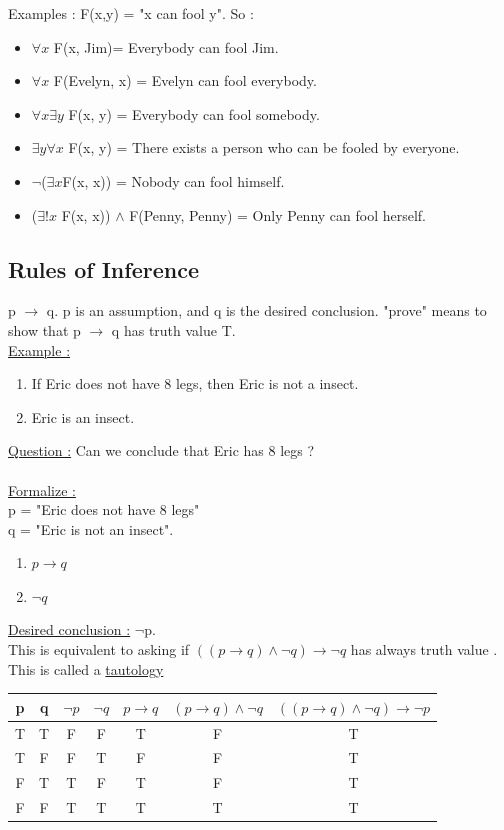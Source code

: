 \documentclass[12pt,a4paper]{article}
\begin{document}
Examples : F(x,y) = "x can fool y". 
So :
\begin{itemize}
	\item $\forall x$ F(x, Jim)= Everybody can fool Jim.
	\item $\forall x$ F(Evelyn, x) = Evelyn can fool everybody.
	\item $\forall x \exists y$ F(x, y) = Everybody can fool somebody.
	\item $\exists y \forall x$ F(x, y) = There exists a person who can be fooled by everyone.
	\item $\neg$($\exists x$F(x, x)) = Nobody can fool himself.
	\item ($\exists ! x$ F(x, x)) $\wedge$ F(Penny, Penny) = Only Penny can fool herself.
\end{itemize}

\subsection{Rules of Inference}
p $\rightarrow$ q. p is an assumption, and q is the desired conclusion. "prove" means to show that p $\rightarrow$ q has truth value T.\\
\underline{Example :}
\begin{enumerate}
	\item If Eric does not have 8 legs, then Eric is not a insect.
	\item Eric is an insect.
\end{enumerate}
\underline{Question :} Can we conclude that Eric has 8 legs ?\\
\\
\underline{Formalize :} \\
p = "Eric does not have 8 legs"\\
q = "Eric is not an insect". 
\begin{enumerate}
	\item $p \rightarrow q$ 
	\item $\neg q$
\end{enumerate}
\underline{Desired conclusion :} $\neg$p. \\
This is equivalent to asking if $((p \rightarrow q) \wedge \neg q) \rightarrow \neg q$ has always truth value . This is called a \underline{tautology}
\begin{center}
\begin{tabular}{cc|ccccc}
		p & q & $\neg p$ & $\neg q$ & $p \rightarrow q$ & $(p \rightarrow q) \wedge \neg q$ & $((p \rightarrow q) \wedge \neg q) \rightarrow \neg p$\\
		\hline
		T&T&F&F&T&F&T\\
		T&F&F&T&F&F&T\\
		F&T&T&F&T&F&T\\
		F&F&T&T&T&T&T\\
	\end{tabular}
\end{center}
\end{document}
